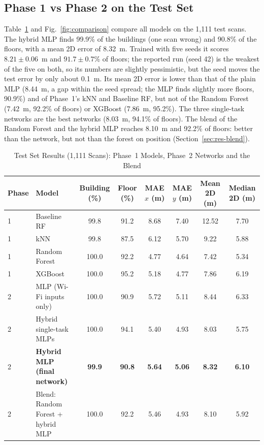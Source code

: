 \subsection{Phase 1 vs Phase 2 on the Test Set}\label{sec:res-test}
Table~\ref{tab:test} and Fig.~\ref{fig:comparison} compare all models on the
1,111 test scans. The hybrid MLP finds 99.9\% of the buildings (one scan
wrong) and 90.8\% of the floors, with a mean 2D error of 8.32~m. Trained with
five seeds it scores $8.21\pm0.06$~m and $91.7\pm0.7$\% of floors; the reported
run (seed 42) is the weakest of the five on both, so its numbers are slightly
pessimistic, but the seed moves the test error by only about 0.1~m. Its mean
2D error is lower than that of the plain MLP (8.44~m, a gap within the seed
spread; the MLP finds slightly more floors, 90.9\%) and of Phase~1's kNN and
Baseline RF, but not of the Random Forest (7.42~m, 92.2\% of floors) or XGBoost
(7.86~m, 95.2\%). The three single-task networks are the best networks
(8.03~m, 94.1\% of floors). The blend of the Random Forest and the hybrid MLP
reaches 8.10~m and 92.2\% of floors: better than the network, but not than the
forest on position (Section~\ref{sec:res-blend}).

\begin{table}[t]
  \caption{Test Set Results (1,111 Scans): Phase~1 Models, Phase~2 Networks and the Blend}
  \label{tab:test}
  \centering
  \footnotesize
  \begin{tabular}{@{}llcccccc@{}}
    \toprule
    Phase & Model & Building (\%) & Floor (\%) & MAE $x$ (m) & MAE $y$ (m) & Mean 2D (m) & Median 2D (m) \\
    \midrule
    1 & Baseline RF & 99.8 & 91.2 & 8.68 & 7.40 & 12.52 & 7.70 \\
    1 & kNN & 99.8 & 87.5 & 6.12 & 5.70 & 9.22 & 5.88 \\
    1 & Random Forest & 100.0 & 92.2 & 4.77 & 4.64 & 7.42 & 5.34 \\
    1 & XGBoost & 100.0 & 95.2 & 5.18 & 4.77 & 7.86 & 6.19 \\
    2 & MLP (Wi-Fi inputs only) & 100.0 & 90.9 & 5.72 & 5.11 & 8.44 & 6.33 \\
    2 & Hybrid single-task MLPs & 100.0 & 94.1 & 5.40 & 4.93 & 8.03 & 5.75 \\
    2 & \textbf{Hybrid MLP (final network)} & \textbf{99.9} & \textbf{90.8} & \textbf{5.64} & \textbf{5.06} & \textbf{8.32} & \textbf{6.10} \\
    2 & Blend: Random Forest + hybrid MLP & 100.0 & 92.2 & 5.46 & 4.93 & 8.10 & 5.92 \\
    \bottomrule
  \end{tabular}
\end{table}

